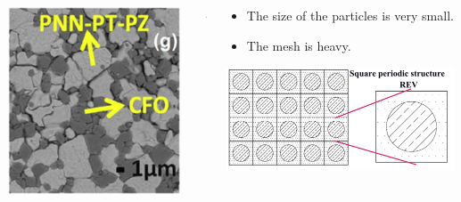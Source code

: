 \documentclass[compress]{beamer}
\begin{document}
\begin{frame}
\begin{columns}[totalwidth=\textwidth]
   \begin{column}{.30\textwidth}
   \includegraphics[width=0.99\textwidth]{Graphic/04_realimage}
   \end{column}
   \begin{column}{.05\textwidth}
   {\color{red} \Large$\mathbf{\boldsymbol{\rightarrow}}$}
   \end{column}
   \begin{column}{.65\textwidth}
   \begin{itemize}[label=$\bullet$, font=\small, leftmargin=*]
	\item The size of the particles is very small.
	\item The mesh is heavy.
	\end{itemize}
   \includegraphics[width=0.99\textwidth]{Graphic/04_periostruc.pdf}

\end{column}
\end{columns}
\end{frame}
\end{document}
